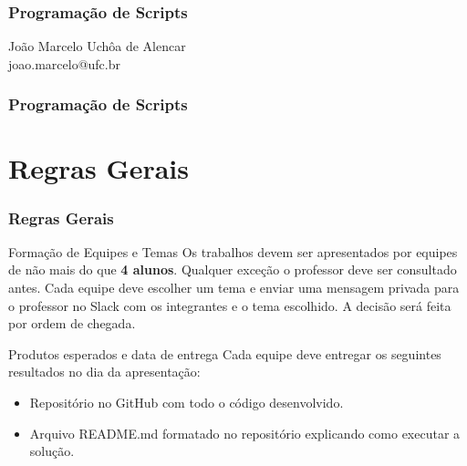 \documentclass{beamer}
\begin{document}
   \begin{frame}
   \frametitle{Programação de Scripts}
      \begin{center}
         João Marcelo Uchôa de Alencar \\
	 joao.marcelo@ufc.br \\
      \end{center}
\end{frame}

   \begin{frame}
      \frametitle{Programação de Scripts}
      \tableofcontents
   \end{frame}

   \section{Regras Gerais}
   \begin{frame}
      \frametitle{Regras Gerais}
      \begin{block}{Formação de Equipes e Temas}
      Os trabalhos devem ser apresentados por equipes de não mais do que \textbf{4 alunos}. Qualquer exceção o professor deve ser consultado antes. Cada equipe deve escolher um tema e enviar uma mensagem privada para o professor no Slack  com os integrantes e o tema escolhido. A decisão será feita por ordem de chegada. 
      \end{block}
      \begin{block}{Produtos esperados e data de entrega}
      Cada equipe deve entregar os seguintes resultados no dia da apresentação:
      \begin{itemize}
         \item Repositório no GitHub com todo o código desenvolvido.
	 \item Arquivo README.md formatado no repositório explicando como executar a solução.
      \end{itemize}
      \end{block}
   \end{frame}
\end{document}
